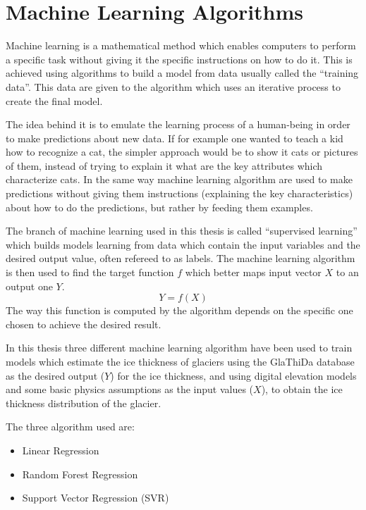 \section{Machine Learning Algorithms}\label{ML}
Machine learning is a mathematical method which enables computers to perform a specific task without giving it the specific instructions on how to do it. This is achieved using algorithms to build a model from data usually called the ``training data''. This data are given to the algorithm which uses an iterative process to create the final model. 

The idea behind it is to emulate the learning process of a human-being in order to make predictions about new data. If for example one wanted to teach a kid how to recognize a cat, the simpler approach would be to show it cats or pictures of them, instead of trying to explain it what are the key attributes which characterize cats. In the same way machine learning algorithm are used to make predictions without giving them instructions (explaining the key characteristics) about how to do the predictions, but rather by feeding them examples.

The branch of machine learning used in this thesis is called ``supervised learning'' which builds models learning from data which contain the input variables and the desired output value, often refereed to as labels.
The machine learning algorithm is then used to find the target function $f$ which better maps input vector $X$ to an output one $Y$.
\begin{equation}
Y = f(X)
\end{equation}
The way this function is computed by the algorithm depends on the specific one chosen to achieve the desired result.

In this thesis three different machine learning algorithm have been used to train models which estimate the ice thickness of glaciers using the GlaThiDa database as the desired output ($Y$) for the ice thickness, and using digital elevation models and some basic physics assumptions as the input values ($X$), to obtain the ice thickness distribution of the glacier.

The three algorithm used are:
\begin{itemize}
	\item Linear Regression
	\item Random Forest Regression
	\item Support Vector Regression (SVR)
\end{itemize}

